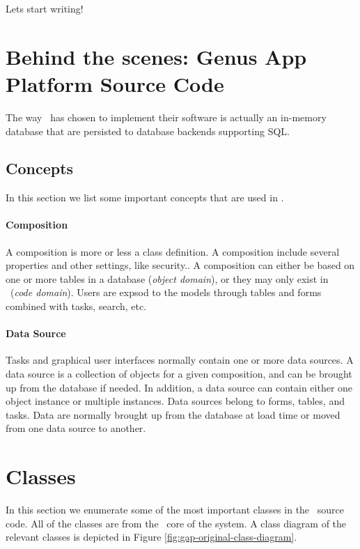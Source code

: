 Lets start writing!

\section{Behind the scenes: Genus App Platform Source Code}
\label{sec:Original Implementation}

The way \genus~has chosen to implement their software is actually an in-memory database that are persisted to database backends supporting SQL. 

\subsection{Concepts}
\label{sub:Concepts}
In this section we list some important concepts that are used in \gap.

\paragraph{Composition}
A composition is more or less a class definition. A composition include several properties and other settings, like security.. A composition can either be based on one or more tables in a database (\textit{object domain}), or they may only exist in \gap~(\textit{code domain}). Users are expsod to the models through tables and forms combined with tasks, search, etc.

\paragraph{Data Source}
Tasks and graphical user interfaces normally contain one or more data sources. A data source is a collection of objects for a given composition, and can be brought up from the database if needed. In addition, a data source can contain either one object instance or multiple instances. Data sources belong to forms, tables, and tasks. Data are normally brought up from the database at load time or moved from one data source to another.


\section{Classes}
\label{sec:Classes}
In this section we enumerate some of the most important classes in the \gap~source code. All of the classes are from the \delphi~core of the system. A class diagram of the relevant classes is depicted in Figure \ref{fig:gap-original-class-diagram}.

